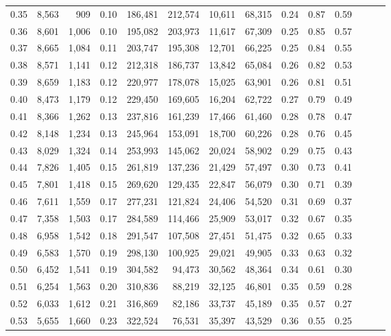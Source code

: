 \begin{tabular}{rrrrrrrrrrrrrr}
0.35 &  8,563 &    909 &  0.10 &  186,481 &  212,574 &  10,611 &  68,315 &  0.24 &  0.87 &      0.59 \\
0.36 &  8,601 &  1,006 &  0.10 &  195,082 &  203,973 &  11,617 &  67,309 &  0.25 &  0.85 &      0.57 \\
0.37 &  8,665 &  1,084 &  0.11 &  203,747 &  195,308 &  12,701 &  66,225 &  0.25 &  0.84 &      0.55 \\
0.38 &  8,571 &  1,141 &  0.12 &  212,318 &  186,737 &  13,842 &  65,084 &  0.26 &  0.82 &      0.53 \\
0.39 &  8,659 &  1,183 &  0.12 &  220,977 &  178,078 &  15,025 &  63,901 &  0.26 &  0.81 &      0.51 \\
0.40 &  8,473 &  1,179 &  0.12 &  229,450 &  169,605 &  16,204 &  62,722 &  0.27 &  0.79 &      0.49 \\
0.41 &  8,366 &  1,262 &  0.13 &  237,816 &  161,239 &  17,466 &  61,460 &  0.28 &  0.78 &      0.47 \\
0.42 &  8,148 &  1,234 &  0.13 &  245,964 &  153,091 &  18,700 &  60,226 &  0.28 &  0.76 &      0.45 \\
0.43 &  8,029 &  1,324 &  0.14 &  253,993 &  145,062 &  20,024 &  58,902 &  0.29 &  0.75 &      0.43 \\
0.44 &  7,826 &  1,405 &  0.15 &  261,819 &  137,236 &  21,429 &  57,497 &  0.30 &  0.73 &      0.41 \\
0.45 &  7,801 &  1,418 &  0.15 &  269,620 &  129,435 &  22,847 &  56,079 &  0.30 &  0.71 &      0.39 \\
0.46 &  7,611 &  1,559 &  0.17 &  277,231 &  121,824 &  24,406 &  54,520 &  0.31 &  0.69 &      0.37 \\
0.47 &  7,358 &  1,503 &  0.17 &  284,589 &  114,466 &  25,909 &  53,017 &  0.32 &  0.67 &      0.35 \\
0.48 &  6,958 &  1,542 &  0.18 &  291,547 &  107,508 &  27,451 &  51,475 &  0.32 &  0.65 &      0.33 \\
0.49 &  6,583 &  1,570 &  0.19 &  298,130 &  100,925 &  29,021 &  49,905 &  0.33 &  0.63 &      0.32 \\
0.50 &  6,452 &  1,541 &  0.19 &  304,582 &   94,473 &  30,562 &  48,364 &  0.34 &  0.61 &      0.30 \\
0.51 &  6,254 &  1,563 &  0.20 &  310,836 &   88,219 &  32,125 &  46,801 &  0.35 &  0.59 &      0.28 \\
0.52 &  6,033 &  1,612 &  0.21 &  316,869 &   82,186 &  33,737 &  45,189 &  0.35 &  0.57 &      0.27 \\
0.53 &  5,655 &  1,660 &  0.23 &  322,524 &   76,531 &  35,397 &  43,529 &  0.36 &  0.55 &      0.25 \\

\end{tabular}
